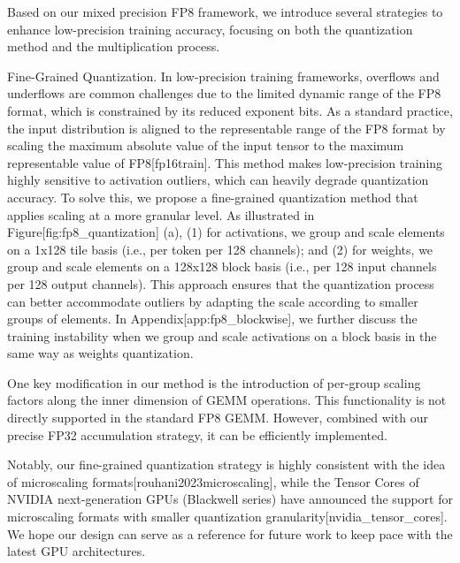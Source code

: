\documentclass[11pt,a4paper]{article}
\begin{document}
Based on our mixed precision FP8 framework, we introduce several strategies to enhance low-precision training accuracy, focusing on both the quantization method and the multiplication process.

Fine-Grained Quantization.
In low-precision training frameworks, overflows and underflows are common challenges due to the limited dynamic range of the FP8 format, which is constrained by its reduced exponent bits. 
As a standard practice, the input distribution is aligned to the representable range of the FP8 format by scaling the maximum absolute value of the input tensor to the maximum representable value of FP8[fp16train]. 
This method makes low-precision training highly sensitive to activation outliers, which can heavily degrade quantization accuracy.
To solve this, we propose a fine-grained quantization method that applies scaling at a more granular level. 
As illustrated in Figure[fig:fp8\_quantization] (a), (1) for activations, we group and scale elements on a 1x128 tile basis (i.e., per token per 128 channels); and (2) for weights, we group and scale elements on a 128x128 block basis (i.e., per 128 input channels per 128 output channels).
This approach ensures that the quantization process can better accommodate outliers by adapting the scale according to smaller groups of elements. 
In Appendix[app:fp8\_blockwise], we further discuss the training instability when we group and scale activations on a block basis in the same way as weights quantization.

One key modification in our method is the introduction of per-group scaling factors along the inner dimension of GEMM operations. 
This functionality is not directly supported in the standard FP8 GEMM. 
However, combined with our precise FP32 accumulation strategy, it can be efficiently implemented.

Notably, our fine-grained quantization strategy is highly consistent with the idea of microscaling formats[rouhani2023microscaling], while the Tensor Cores of NVIDIA next-generation GPUs (Blackwell series) have announced the support for microscaling formats with smaller quantization granularity[nvidia\_tensor\_cores]. 
We hope our design can serve as a reference for future work to keep pace with the latest GPU architectures.
\end{document}
